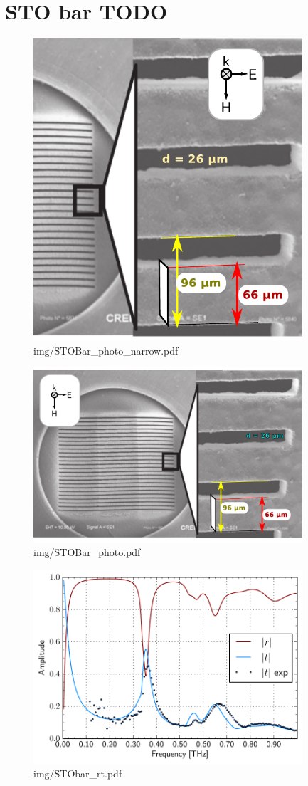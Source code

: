\section{STO bar TODO} %
\begin{figure} \caption{img/STOBar\_photo\_narrow.pdf}  \centering \includegraphics[width=10cm]{img/STOBar_photo_narrow.pdf} \end{figure} \clearpage
\begin{figure} \caption{img/STOBar\_photo.pdf}  \centering \includegraphics[width=10cm]{img/STOBar_photo.pdf} \end{figure} \clearpage
\begin{figure} \caption{img/STObar\_rt.pdf}  \centering \includegraphics[width=10cm]{img/STObar_rt.pdf} \end{figure} \clearpage
